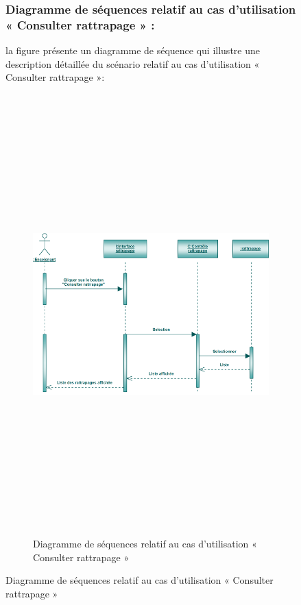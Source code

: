 \documentclass[12 pt]{report}
\begin{document}
\begin{figure}[h]
\begin{center}
\subsubsection{Diagramme de séquences relatif au cas d’utilisation « Consulter rattrapage » :}
la figure   présente un diagramme de séquence qui illustre une description détaillée du scénario relatif au cas d’utilisation « Consulter rattrapage »: 
{\begin{figure}[h]
 \begin{center}
\includegraphics[width= 18 cm ,height=  17cm]{sec_cons_rat.PNG}
\caption{Diagramme de séquences relatif au cas d’utilisation « Consulter rattrapage  »}

\end{center}
\end{figure}}


\newpage

\end{center}
\end{figure}
\end{document}
